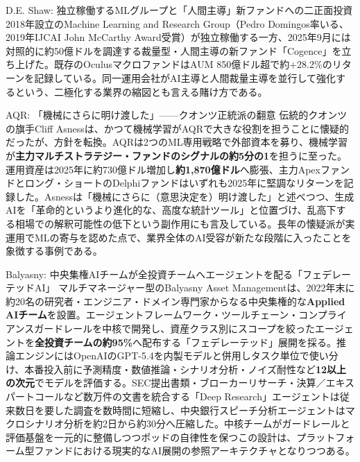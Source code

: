 \begin{casestudy}{D.E. Shaw: 独立稼働するMLグループと「人間主導」新ファンドへの二正面投資}
2018年設立のMachine Learning and Research Group（Pedro Domingos率いる、2019年IJCAI John McCarthy Award受賞）が独立稼働する一方、2025年9月には対照的に約50億ドルを調達する裁量型・人間主導の新ファンド「Cogence」を立ち上げた。既存のOculusマクロファンドはAUM 850億ドル超で約+28.2\%のリターンを記録している\cite{bloomberg_deshaw2025}。同一運用会社がAI主導と人間裁量主導を並行して強化するという、二極化する業界の縮図とも言える賭け方である。
\end{casestudy}

\begin{casestudy}{AQR: 「機械にさらに明け渡した」——クオンツ正統派の翻意}
伝統的クオンツの旗手Cliff Asnessは、かつて機械学習がAQRで大きな役割を担うことに懐疑的だったが、方針を転換。AQRは2つのML専用戦略で外部資本を募り、機械学習が\textbf{主力マルチストラテジー・ファンドのシグナルの約5分の1}を担うに至った\cite{x03aqr_bloomberg2025}。運用資産は2025年に約730億ドル増加し\textbf{約1,870億ドル}へ膨張、主力Apexファンドとロング・ショートのDelphiファンドはいずれも2025年に堅調なリターンを記録した\cite{x03forbes_billionaires2026}。Asnessは「機械にさらに（意思決定を）明け渡した」と述べつつ、生成AIを「革命的というより進化的な、高度な統計ツール」と位置づけ、乱高下する相場での解釈可能性の低下という副作用にも言及している\cite{x03aqr_hedgeco2025}。長年の懐疑派が実運用でMLの寄与を認めた点で、業界全体のAI受容が新たな段階に入ったことを象徴する事例である。
\end{casestudy}

\begin{casestudy}{Balyasny: 中央集権AIチームが全投資チームへエージェントを配る「フェデレーテッドAI」}
マルチマネージャー型のBalyasny Asset Managementは、2022年末に約20名の研究者・エンジニア・ドメイン専門家からなる中央集権的な\textbf{Applied AIチーム}を設置。エージェントフレームワーク・ツールチェーン・コンプライアンスガードレールを中核で開発し、資産クラス別にスコープを絞ったエージェントを\textbf{全投資チームの約95\%}へ配布する「フェデレーテッド」展開を採る\cite{x03balyasny_openai2026,x03balyasny_wikipedia2026}。推論エンジンにはOpenAIのGPT-5.4を内製モデルと併用しタスク単位で使い分け、本番投入前に予測精度・数値推論・シナリオ分析・ノイズ耐性など\textbf{12以上の次元}でモデルを評価する\cite{x03balyasny_mlq2026}。SEC提出書類・ブローカーリサーチ・決算／エキスパートコールなど数万件の文書を統合する「Deep Research」エージェントは従来数日を要した調査を数時間に短縮し、中央銀行スピーチ分析エージェントはマクロシナリオ分析を約2日から約30分へ圧縮した\cite{x03balyasny_openai2026}。中核チームがガードレールと評価基盤を一元的に整備しつつポッドの自律性を保つこの設計は、プラットフォーム型ファンドにおける現実的なAI展開の参照アーキテクチャとなりつつある。
\end{casestudy}

